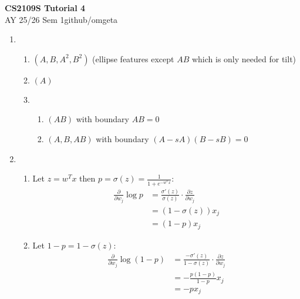 \documentclass[12pt, a4paper]{article}
\newcommand{\mytitle}{CS2109S Tutorial 4}
\newcommand{\myauthor}{github/omgeta}
\newcommand{\mydate}{AY 25/26 Sem 1}
\begin{document}
\raggedright
\footnotesize
\begin{center}
{\normalsize{\textbf{\mytitle}}} \\
{\footnotesize{\mydate\hspace{2pt}\textemdash\hspace{2pt}\myauthor}}
\end{center}
\begin{enumerate}[\Alph*.]
  \item 
    \begin{enumerate}[\arabic*.]
      \item $(A, B, A^2, B^2)$ (ellipse features except $AB$ which is only needed for tilt) 

      \item $(A)$ 

      \item 
        \begin{enumerate}[(\alph*.)]
          \item $(AB)$ with boundary $AB = 0$
          \item $(A, B, AB)$ with boundary $(A - sA)(B - sB) = 0$
        \end{enumerate}
    \end{enumerate}

  \item 
    \begin{enumerate}[\arabic*.]
      \item Let $z = w^Tx$ then $p = \sigma(z)= \frac{1}{1+e^{-w^Tx}}$:
        \begin{align*}
          \frac{\partial}{\partial w_j} \log p &= \frac{\sigma '(z)}{\sigma(z)} \cdot \frac{\partial z}{\partial w_j}\\
                                               &= (1-\sigma(z))x_j\\
                                               &= (1-p)x_j
        \end{align*}

      \item Let $1 - p = 1 - \sigma(z)$:
        \begin{align*}
          \frac{\partial}{\partial w_j} \log (1 -p) &= \frac{-\sigma '(z)}{1-\sigma(z)} \cdot \frac{\partial z}{\partial w_j}\\
                                               &= -\frac{p(1-p)}{1-p}x_j\\ 
                                               &= -px_j
        \end{align*}


\end{enumerate}
\end{enumerate}
\end{document}
